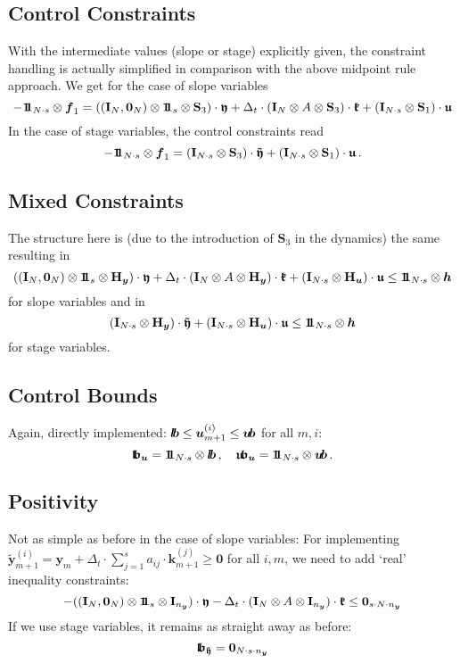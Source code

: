 \documentclass{article}
\newcommand{\kron}{\otimes}%
\newcommand{\vectorfont}[1]{\boldsymbol{#1}}%
\newcommand{\greekvectorfont}[1]{\boldsymbol{#1}}%
\newcommand{\matrixfont}[1]{\mathbf{#1}}%
\newcommand{\fvec}{\vectorfont{f}}
\newcommand{\hvec}{\vectorfont{h}}
\newcommand{\kvec}{\vectorfont{k}}
\newcommand{\uvec}{\vectorfont{u}}
\newcommand{\yvec}{\vectorfont{y}}
\newcommand{\tildeyvec}{\vectorfont{\tilde{y}}}
\newcommand{\kfrakvec}{\vectorfont{\mathfrak{k}}}
\newcommand{\ufrakvec}{\vectorfont{\mathfrak{u}}}
\newcommand{\yfrakvec}{\vectorfont{\mathfrak{y}}}
\newcommand{\tildeyfrakvec}{\vectorfont{\tilde{\mathfrak{y}}}}
\newcommand{\nullvec}{\greekvectorfont{0}}
\newcommand{\lbvec}{\vectorfont{l\negthinspace b}}
\newcommand{\ubvec}{\vectorfont{u\negthinspace b}}
\newcommand{\lbfrakvec}{\vectorfont{\mathfrak{l\negthinspace b}}}
\newcommand{\ubfrakvec}{\vectorfont{\mathfrak{u\negthinspace b}}}
\newcommand{\einsvec}{\vectorfont{1}\negthinspace\negthinspace\vectorfont{1}} %
\newcommand{\Hmat}{\matrixfont{H}}
\newcommand{\Imat}{\matrixfont{I}}%
\newcommand{\Smat}{\matrixfont{S}}
\begin{document}
%
\subsection*{Control Constraints}
%
With the intermediate values (slope or stage) explicitly given, the constraint handling is actually simplified in comparison with the above midpoint rule approach.
We get for the case of slope variables
\[
-\einsvec_{N\cdot s} \kron \fvec_1
 =  ((\Imat_{N},\nullvec_N)\kron \einsvec_s \kron \Smat_3)\cdot \yfrakvec
    + \Delta_t \cdot (\Imat_N \kron A \kron \Smat_3)\cdot \kfrakvec
    + (\Imat_{N\cdot s} \kron \Smat_1)\cdot \ufrakvec 
\]
In the case of stage variables, the control constraints read
\[
-\einsvec_{N\cdot s} \kron \fvec_1
 = (\Imat_{N\cdot s} \kron \Smat_3) \cdot \tildeyfrakvec + (\Imat_{N\cdot s} \kron \Smat_1) \cdot \ufrakvec\,. 
\]
%
\subsection*{Mixed Constraints}
%
The structure here is (due to the introduction of $\Smat_3$ in the dynamics) the same resulting in
\[
 ((\Imat_{N},\nullvec_N)\kron \einsvec_s \kron \Hmat_{\yvec})\cdot \yfrakvec
+ \Delta_t \cdot (\Imat_N \kron A \kron \Hmat_{\yvec})\cdot \kfrakvec
+ (\Imat_{N\cdot s} \kron \Hmat_{\uvec})\cdot \ufrakvec 
\leq
\einsvec_{N\cdot s} \kron \hvec
\]
for slope variables and in
\[
(\Imat_{N\cdot s} \kron \Hmat_{\yvec}) \cdot \tildeyfrakvec + (\Imat_{N\cdot s} \kron \Hmat_{\uvec}) \cdot \ufrakvec \leq \einsvec_{N\cdot s} \kron \hvec
\]
for stage variables.


%
\subsection*{Control Bounds}
%
Again, directly implemented: $\lbvec \leq \uvec_{m+1}^{(i)} \leq \ubvec$ for all $m,i$:
\[
\lbfrakvec_{\uvec} = \einsvec_{N\cdot s} \kron \lbvec\,,\quad
\ubfrakvec_{\uvec} = \einsvec_{N\cdot s} \kron \ubvec\,.
\]

%
\subsection*{Positivity}
%
Not as simple as before in the case of slope variables:
For implementing
$
\tildeyvec_{m+1}^{(i)} = \yvec_m + \Delta_t \cdot \sum_{j=1}^s a_{ij}\cdot \kvec_{m+1}^{(j)}\geq \nullvec
$
for all $i,m$, we need to add `real' inequality constraints:
\[
-((\Imat_{N} ,\nullvec_N) \kron \einsvec_s \kron \Imat_{n_{\yvec}}) \cdot \yfrakvec - \Delta_t \cdot (\Imat_{N} \kron A \kron \Imat_{n_{\yvec}}) \cdot \kfrakvec \leq \nullvec_{s\cdot N \cdot n_{\yvec}}
\]
If we use stage variables, it remains as straight away as before:
\[
\lbfrakvec_{\tildeyfrakvec} = \nullvec_{N \cdot s \cdot n_{\yvec}}
\]
\end{document}
